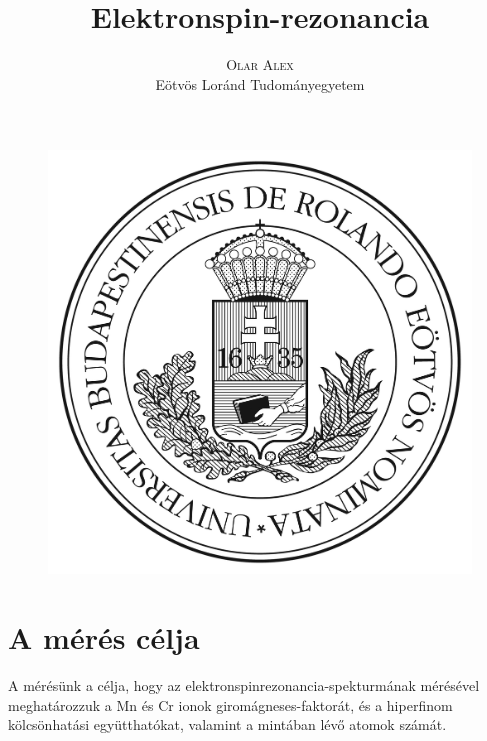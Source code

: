 \documentclass[12pt,a4paper]{article}
\title{\textbf{Elektronspin-rezonancia}}
\author{\Large{\textsc{Olar Alex}} \vspace{10pt}\\
	\textrm{Eötvös Loránd Tudományegyetem}
	}
\date{}
\theoremstyle{plain}
\begin{document}
\addtolength{\voffset}{-1.0cm}
\addtolength{\textheight}{1.0cm}
\begin{titlepage}
    \maketitle

    \vfill

    \begin{figure}[H]
        \centering
        \includegraphics[scale=0.6]{../elte.jpg}
    \end{figure}

    \thispagestyle{empty}
\end{titlepage}

\newpage

\linespread{1.5}

\section{A mérés célja}

\par A mérésünk a célja, hogy az elektronspinrezonancia-spekturmának mérésével
meghatározzuk a \textrm{Mn} és \textrm{Cr} ionok
giromágneses-faktorát, és a hiperfinom kölcsönhatási
együtthatókat, valamint a mintában lévő atomok számát.
\end{document}
